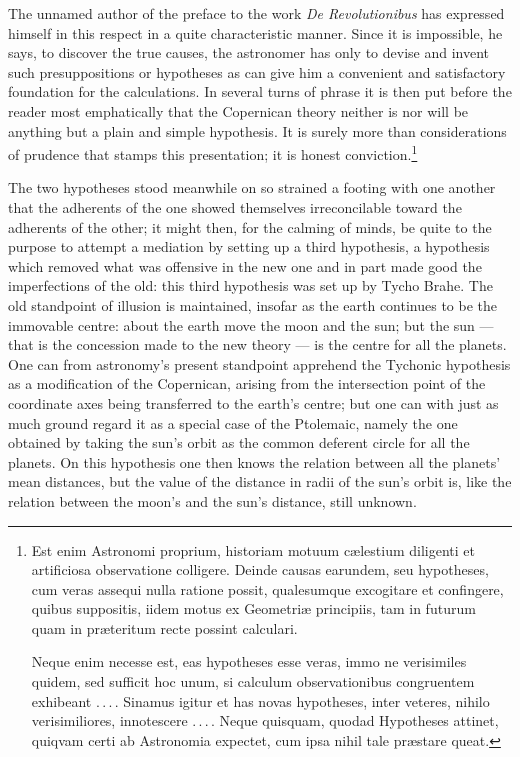 \documentclass[12pt,a4paper]{book}
\begin{document}
The unnamed author of the preface to the work \textit{De Revolutionibus} has expressed himself in this
respect in a quite characteristic manner. Since it is impossible, he says, to discover the true causes,
the astronomer has only to devise and invent such presuppositions or hypotheses as can give him a
convenient and satisfactory foundation for the calculations. In several turns of phrase it is then put
before the reader most emphatically that the Copernican theory neither is nor will be anything but a plain
and simple hypothesis. It is surely more than considerations of
prudence that stamps this presentation; it is honest
conviction.\footnote{%
Est enim Astronomi proprium, historiam motuum cælestium diligenti et artificiosa observatione colligere.
Deinde causas earundem, seu hypotheses, cum veras assequi nulla ratione possit, qualesumque excogitare et
confingere, quibus suppositis, iidem motus ex Geometriæ principiis, tam in futurum quam in præteritum
recte possint calculari.\par
Neque enim necesse est, eas hypotheses esse veras, immo ne verisimiles quidem, sed sufficit hoc unum, si
calculum observationibus congruentem exhibeant .\,.\,.\,. Sinamus igitur et has novas hypotheses, inter
veteres, nihilo verisimiliores, innotescere .\,.\,.\,. Neque quisquam, quodad Hypotheses attinet, quiqvam
certi ab Astronomia expectet, cum ipsa nihil tale præstare queat.}

The two hypotheses stood meanwhile on so strained a footing with one another that the adherents of the one
showed themselves irreconcilable toward the adherents of the other; it might then, for the calming of
minds, be quite to the purpose to attempt a mediation by setting up a third hypothesis, a hypothesis which
removed what was offensive in the new one and in part made good the imperfections of the old: this third
hypothesis was set up by Tycho Brahe. The old standpoint of illusion is maintained, insofar as the earth
continues to be the immovable centre: about the earth move the moon and the sun; but the sun --- that is
the concession made to the new theory --- is the centre for all the planets. One can from astronomy's
present standpoint apprehend the Tychonic hypothesis as a modification of the Copernican, arising from the
intersection point of the coordinate axes being transferred to the earth's centre; but one can with just as
much ground regard it as a special case of the Ptolemaic, namely the one obtained by taking the sun's orbit
as the common deferent circle for all the planets. On this hypothesis one then knows the relation between
all the planets' mean distances, but the value of the distance in radii of the sun's orbit is, like the
relation between the moon's and the sun's distance, still unknown.
\end{document}
